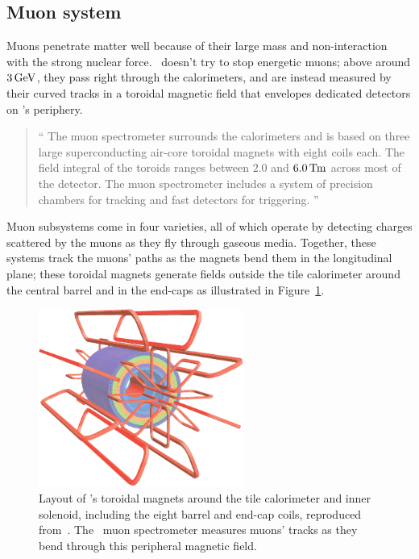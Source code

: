 \subsection{Muon system}
\label{sec:atlas_muon}
Muons penetrate matter well because of their large mass and non-interaction
with the strong nuclear force.
\atlas\ doesn't try to stop energetic muons;
above around $3\,\eV[G]$, they pass right through the calorimeters, and are
instead measured by their curved tracks in a toroidal magnetic field that
envelopes dedicated detectors on \atlas's periphery.
\begin{quote}
``%
The muon spectrometer surrounds the calorimeters and is based on three large
superconducting air-core toroidal magnets with eight coils each.
The field integral of the toroids ranges between $2.0$ and
$6.0\,\mathrm{T\kern-0.15ex m}$ across most of the detector.
The muon spectrometer includes a system of precision chambers for tracking and
fast detectors for triggering.%
''~\cite{atlas2022searches}
\end{quote}
Muon subsystems come in four varieties, all of which operate by detecting
charges scattered by the muons as they fly through gaseous media.
Together, these systems track the muons' paths as the magnets bend them in the
longitudinal plane; these toroidal magnets generate fields outside the tile
calorimeter around the central barrel and in the end-caps as illustrated in
Figure~\ref{fig:atlas_magnets}.

\begin{figure}[tp]
\centering
\includegraphics[width=0.6\textwidth]{figures/atlas_magnets.pdf}
\caption[
Layout of \atlas's toroidal magnets around the tile calorimeter and inner
solenoid
]{%
Layout of \atlas's toroidal magnets around the tile calorimeter and inner
solenoid, including the eight barrel and end-cap coils,
reproduced from~\cite{atlas2008experiment}.
The \atlas\ muon spectrometer measures muons' tracks as they bend through
this peripheral magnetic field.
}
\label{fig:atlas_magnets}
\end{figure}

